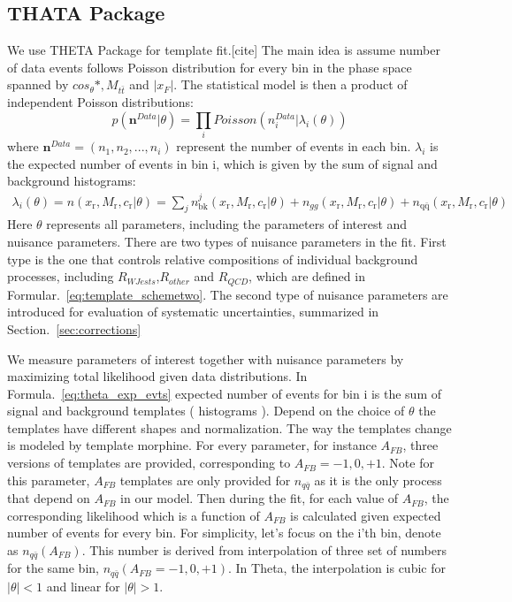 \documentclass{cmspaperpdf}
\begin{document}
\subsection{THATA Package}
\label{sec:theta_methods}
We use THETA Package for template fit.[cite] The main idea is assume number of data events follows Poisson distribution for every bin in the phase space spanned by $cos_\theta*,M_{t\bar{t}}$ and $|x_F|$. The statistical model is then a product of independent Poisson distributions:
\begin{equation}
p(\mathbf{n}^{Data}|\theta)=\prod_i Poisson(n_i^{Data}|\lambda_i(\theta))
\label{eq:theta_likelihood}
\end{equation}
where $\mathbf{n}^{Data}=(n_1,n_2,...,n_i)$ represent the number of events in each bin. $\lambda_i$ is the expected number of events in bin i, which is given by the sum of signal and background histograms:
\begin{align}
\lambda_i(\theta) = n(x_\mathrm{r},M_\mathrm{r},c_\mathrm{r}|\theta) = \sum_j n^j_\mathrm{bk}(x_\mathrm{r},M_\mathrm{r},c_\mathrm{r}|\theta)+n_{gg}(x_\mathrm{r},M_\mathrm{r},c_\mathrm{r}|\theta) +n_\mathrm{q\bar{q}}(x_\mathrm{r}, M_\mathrm{r}, c_\mathrm{r}|\theta)
\label{eq:theta_exp_evts}
\end{align}
Here $\theta$ represents all parameters, including the parameters of interest and nuisance parameters. There are two types of nuisance parameters in the fit. First type is the one that controls relative compositions of individual background processes, including $R_{WJests}$,$R_{other}$ and $R_{QCD}$, which are defined in Formular.~\ref{eq:template_schemetwo}. The second type of nuisance parameters are introduced for evaluation of systematic uncertainties, summarized in Section.~\ref{sec:corrections}

We measure parameters of interest together with nuisance parameters by maximizing total likelihood given data distributions. In Formula.~\ref{eq:theta_exp_evts}  expected number of events for bin i is the sum of signal and background templates ( histograms ). Depend on the choice of $\theta$ the templates have different shapes and normalization. The way the templates change is modeled by template morphine. For every parameter, for instance $A_{FB}$, three versions of templates are provided, corresponding to $A_{FB}= -1,0,+1$. Note for this parameter, $A_{FB}$ templates are only provided for $n_{q\bar{q}}$ as it is the only process that depend on $A_{FB}$ in our model. Then during the fit, for each value of $A_{FB}$, the corresponding likelihood which is a function of $A_{FB}$ is calculated given expected number of events for every bin. For simplicity, let's focus on the i'th bin, denote as $n_{q\bar{q}}(A_{FB})$. This number is derived from interpolation of three set of numbers for the same bin,  $n_{q\bar{q}}(A_{FB}=-1,0,+1)$. In Theta, the interpolation is cubic for $|\theta|<1$ and linear for $|\theta|>1$.
\end{document}
